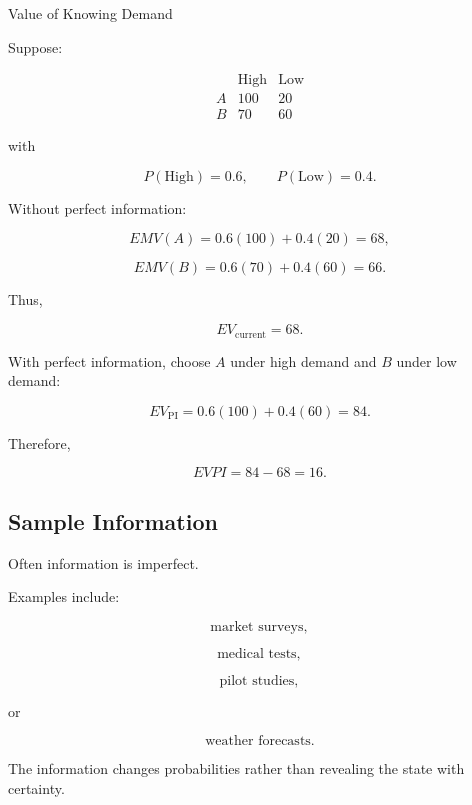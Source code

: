\begin{workedexamplebox}{Value of Knowing Demand}

Suppose:

\[
\begin{array}{c|cc}
&
\text{High}
&
\text{Low}
\\
\hline
A
&
100
&
20
\\
B
&
70
&
60
\end{array}
\]

with

\[
P(\text{High})=0.6,
\qquad
P(\text{Low})=0.4.
\]

Without perfect information:

\[
EMV(A)
=
0.6(100)+0.4(20)
=
68,
\]

\[
EMV(B)
=
0.6(70)+0.4(60)
=
66.
\]

Thus,

\[
EV_{\mathrm{current}}
=
68.
\]

With perfect information, choose \(A\) under high demand and \(B\) under
low demand:

\[
EV_{\mathrm{PI}}
=
0.6(100)
+
0.4(60)
=
84.
\]

Therefore,

\begin{answerbox}
\[
\boxed{
EVPI
=
84-68
=
16.
}
\]
\end{answerbox}

\end{workedexamplebox}

\subsection{Sample Information}
\label{subsec:sample-information}

Often information is imperfect.

Examples include:

\[
\boxed{
\text{market surveys},
}
\]

\[
\boxed{
\text{medical tests},
}
\]

\[
\boxed{
\text{pilot studies},
}
\]

or

\[
\boxed{
\text{weather forecasts}.
}
\]

The information changes probabilities rather than revealing the state
with certainty.

